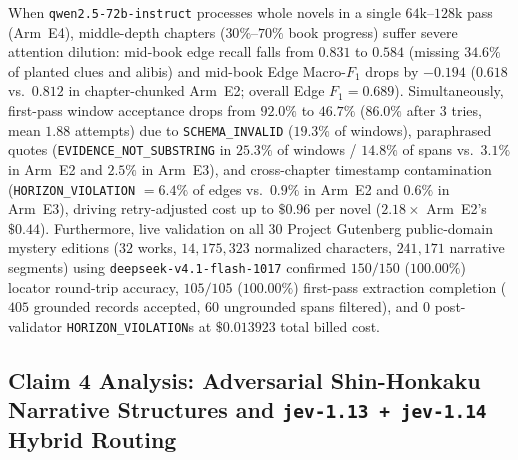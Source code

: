 \documentclass[11pt,twocolumn]{article}
\begin{document}
When \texttt{qwen2.5-72b-instruct} processes whole novels in a single $64\text{k--}128\text{k}$ pass (Arm~E4), middle-depth chapters ($30\%\text{--}70\%$ book progress) suffer severe attention dilution: mid-book edge recall falls from $0.831$ to $0.584$ (missing $34.6\%$ of planted clues and alibis) and mid-book Edge Macro-$F_1$ drops by $-0.194$ ($0.618$ vs.\ $0.812$ in chapter-chunked Arm~E2; overall Edge $F_1 = 0.689$). Simultaneously, first-pass window acceptance drops from $92.0\%$ to $46.7\%$ ($86.0\%$ after 3 tries, mean $1.88$ attempts) due to \texttt{SCHEMA\_INVALID} ($19.3\%$ of windows), paraphrased quotes (\texttt{EVIDENCE\_NOT\_SUBSTRING} in $25.3\%$ of windows / $14.8\%$ of spans vs.\ $3.1\%$ in Arm~E2 and $2.5\%$ in Arm~E3), and cross-chapter timestamp contamination (\texttt{HORIZON\_VIOLATION} $= 6.4\%$ of edges vs.\ $0.9\%$ in Arm~E2 and $0.6\%$ in Arm~E3), driving retry-adjusted cost up to $\$0.96$ per novel ($2.18\times$ Arm~E2's $\$0.44$). Furthermore, live validation on all $30$ Project Gutenberg public-domain mystery editions ($32$ works, $14{,}175{,}323$ normalized characters, $241{,}171$ narrative segments) using \texttt{deepseek-v4.1-flash-1017} confirmed $150/150$ ($100.00\%$) locator round-trip accuracy, $105/105$ ($100.00\%$) first-pass extraction completion ($405$ grounded records accepted, $60$ ungrounded spans filtered), and $0$ post-validator \texttt{HORIZON\_VIOLATION}s at $\$0.013923$ total billed cost.



\subsection{\texorpdfstring{Claim 4 Analysis: Adversarial Shin-Honkaku Narrative Structures and \texttt{jev-1.13 + jev-1.14} Hybrid Routing}{Claim 4 Analysis: Adversarial Shin-Honkaku Narrative Structures and Hybrid Routing}}
\label{sec:claim4}
\end{document}
